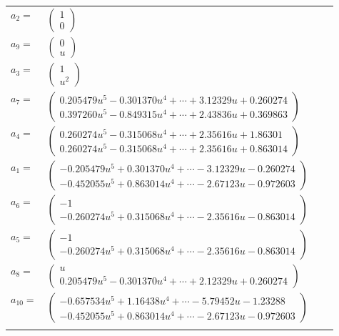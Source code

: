 \documentclass[1p]{elsarticle_modified}
\theoremstyle{definition}
\begin{document}
\begin{tabular}{m{7pt} m{180pt} m{7pt} m{180pt} }
\flushright $a_{2}=$&$\begin{pmatrix}1\\0\end{pmatrix}$ \\
\flushright $a_{9}=$&$\begin{pmatrix}0\\u\end{pmatrix}$ \\
\flushright $a_{3}=$&$\begin{pmatrix}1\\u^2\end{pmatrix}$ \\
\flushright $a_{7}=$&$\begin{pmatrix}0.205479 u^{5}-0.301370 u^{4}+\cdots+3.12329 u+0.260274\\0.397260 u^{5}-0.849315 u^{4}+\cdots+2.43836 u+0.369863\end{pmatrix}$ \\
\flushright $a_{4}=$&$\begin{pmatrix}0.260274 u^{5}-0.315068 u^{4}+\cdots+2.35616 u+1.86301\\0.260274 u^{5}-0.315068 u^{4}+\cdots+2.35616 u+0.863014\end{pmatrix}$ \\
\flushright $a_{1}=$&$\begin{pmatrix}-0.205479 u^{5}+0.301370 u^{4}+\cdots-3.12329 u-0.260274\\-0.452055 u^{5}+0.863014 u^{4}+\cdots-2.67123 u-0.972603\end{pmatrix}$ \\
\flushright $a_{6}=$&$\begin{pmatrix}-1\\-0.260274 u^{5}+0.315068 u^{4}+\cdots-2.35616 u-0.863014\end{pmatrix}$ \\
\flushright $a_{5}=$&$\begin{pmatrix}-1\\-0.260274 u^{5}+0.315068 u^{4}+\cdots-2.35616 u-0.863014\end{pmatrix}$ \\
\flushright $a_{8}=$&$\begin{pmatrix}u\\0.205479 u^{5}-0.301370 u^{4}+\cdots+2.12329 u+0.260274\end{pmatrix}$ \\
\flushright $a_{10}=$&$\begin{pmatrix}-0.657534 u^{5}+1.16438 u^{4}+\cdots-5.79452 u-1.23288\\-0.452055 u^{5}+0.863014 u^{4}+\cdots-2.67123 u-0.972603\end{pmatrix}$\\&\end{tabular}
\end{document}
